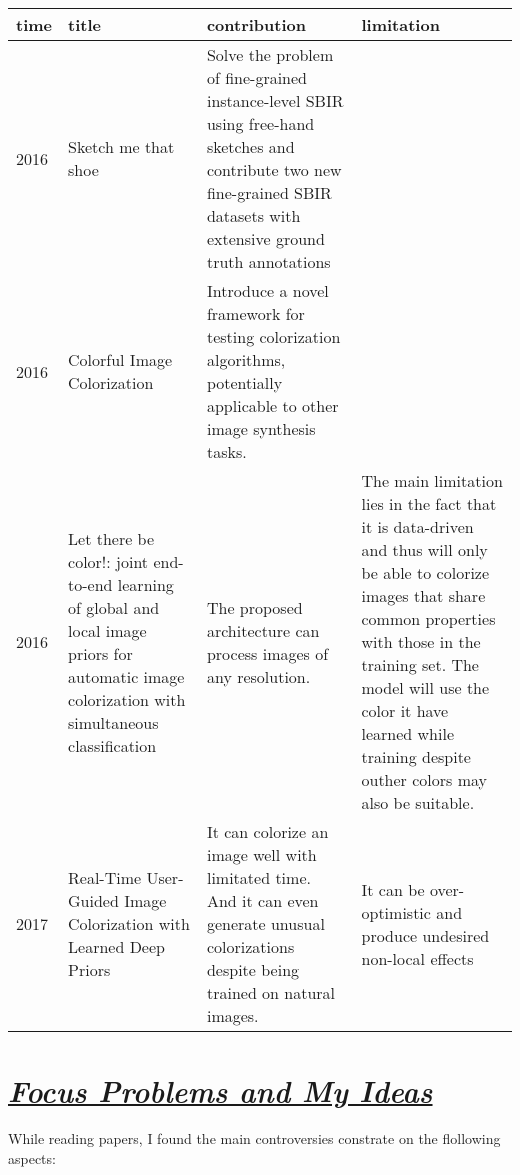 \documentclass{article}
\begin{document}
\begin{table}[htbp]
\centering
\begin{tabular}{|p{1cm}|p{4.5cm}|p{5.5cm}|p{5.5cm}|}
\hline
time&title&contribution&limitation\\

\hline
2016&Sketch me that shoe\cite{Q_Yu2016Sketch}&Solve the problem of fine-grained instance-level SBIR using free-hand sketches and contribute two new
fine-grained SBIR datasets with extensive ground truth annotations & \\

\hline
2016&Colorful Image Colorization\cite{Zhang2016Colorful}&Introduce a novel framework for testing colorization algorithms, potentially applicable to other image synthesis tasks.& \\

\hline
2016&Let there be color!: joint end-to-end learning of global and local image priors for automatic image colorization with simultaneous classification\cite{Iizuka2016Let}&The proposed architecture can process images of any resolution.&The main limitation lies in the fact that it is data-driven and thus will only be able to colorize images that share common properties with those in the training set. The model will use the color it have learned while training despite outher colors may also be suitable. \\



\hline
2017&Real-Time User-Guided Image Colorization with Learned Deep Priors\cite{Efros2017Real}&It can colorize an image well with limitated time. And it can even generate unusual colorizations despite being trained on natural images.& It can be over-optimistic and produce undesired non-local effects\\

\hline


\end{tabular}
\end{table}


\section{\textbf{\underline{\emph{Focus Problems and My Ideas}}}}

\indent While reading papers, I found the main controversies constrate on the flollowing aspects:
\end{document}
